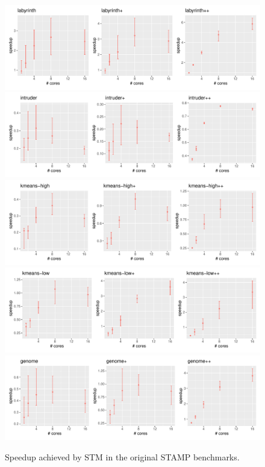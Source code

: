 \begin{figure}
    \centering
    \includegraphics[width=\textwidth,keepaspectratio]{gfx/results/stamp/stamp_labyrinth_comb}
    \includegraphics[width=\textwidth,keepaspectratio]{gfx/results/stamp/stamp_intruder_comb}
    \includegraphics[width=\textwidth,keepaspectratio]{gfx/results/stamp/stamp_kmeans-high_comb}
    \includegraphics[width=\textwidth,keepaspectratio]{gfx/results/stamp/stamp_kmeans-low_comb}
    \includegraphics[width=\textwidth,keepaspectratio]{gfx/results/stamp/stamp_genome_comb}
    \caption{Speedup achieved by STM in the original STAMP  benchmarks.}%
    \label{fig:evaluation:stamp:genome}
\end{figure}

